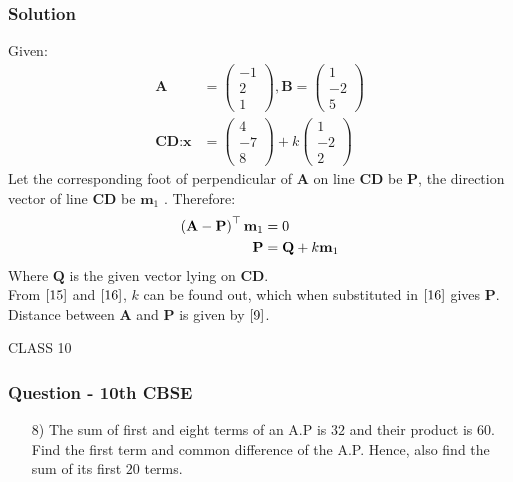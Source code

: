 \documentclass{beamer}
\begin{document}
\begin{frame}
\frametitle{Solution}
Given:
\begin{align}
    \textbf{A} &= \begin{pmatrix}
        -1\\
        2\\
        1
    \end{pmatrix},
    \textbf{B} = \begin{pmatrix}
        1\\
        -2\\
        5
    \end{pmatrix}\\
    \textbf{CD}:\textbf{x} &= \begin{pmatrix}
        4\\
        -7\\
        8
    \end{pmatrix}
    +k\begin{pmatrix}
        1\\
        -2\\
        2
    \end{pmatrix}
\end{align}
Let the corresponding foot of perpendicular of $\textbf{A}$ on line $\textbf{CD}$ be $\textbf{P}$, the direction vector of line $\textbf{CD}$ be $\textbf{m}_1$ . Therefore:
\begin{align}
    \left(\textbf{A}-\textbf{P}\right)^{\top} \textbf{m}_1 &= 0 \label{15}\\
    \textbf{P} &= \textbf{Q} + k\textbf{m}_1 \label{16}
\end{align}
Where $\textbf{Q}$ is the given vector lying on $\textbf{CD}$.\\
From $\eqref{15}$ and $\eqref{16}$, $k$ can be found out, which when substituted in $\eqref{16}$ gives $\textbf{P}$. Distance between $\textbf{A}$ and $\textbf{P}$ is given by $\eqref{9}$.
    
\end{frame}








\begin{frame}[standout]
    CLASS 10
\end{frame}






\begin{frame}
\frametitle{Question - 10th CBSE}
\begin{enumerate}
    \item [8)]
The sum of first and eight terms of an A.P is $32$ and their product is $60$. Find the first term and common difference of the A.P. Hence, also find the sum of its first $20$ terms. 
\end{enumerate}
\end{frame}
\end{document}
